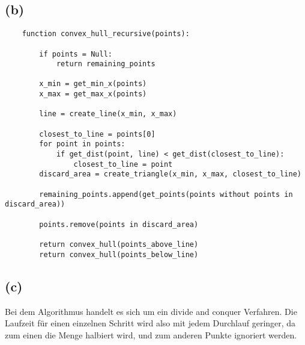 \documentclass[a4paper]{scrartcl}
\begin{document}
\subsection*{(b)}
\begin{lstlisting}
	function convex_hull_recursive(points):
		
		if points = Null:
			return remaining_points
			
		x_min = get_min_x(points)
		x_max = get_max_x(points)
		
		line = create_line(x_min, x_max)
		
		closest_to_line = points[0]
		for point in points:
			if get_dist(point, line) < get_dist(closest_to_line):
				closest_to_line = point
		discard_area = create_triangle(x_min, x_max, closest_to_line)
		
		remaining_points.append(get_points(points without points in discard_area))
		
		points.remove(points in discard_area)
		
		return convex_hull(points_above_line)
		return convex_hull(points_below_line)
\end{lstlisting}


\subsection*{(c)}
Bei dem Algorithmus handelt es sich um ein divide and conquer Verfahren. Die Laufzeit für einen einzelnen Schritt wird also mit jedem Durchlauf geringer, da zum einen die Menge halbiert wird, und zum anderen Punkte ignoriert werden.
\end{document}
